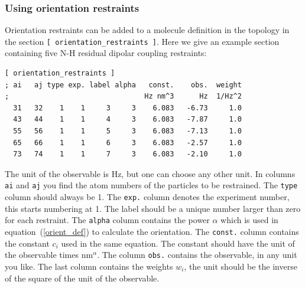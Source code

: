 \subsubsection{Using orientation restraints}
Orientation restraints can be added to a molecule definition in
the topology in the section {\tt [ orientation\_restraints ]}.
Here we give an example section containing five N-H residual dipolar
coupling restraints:
\begin{verbatim}
[ orientation_restraints ]
; ai   aj type exp. label alpha   const.    obs.  weight 
;                                Hz nm^3      Hz  1/Hz^2
  31   32    1    1     3     3    6.083   -6.73     1.0
  43   44    1    1     4     3    6.083   -7.87     1.0
  55   56    1    1     5     3    6.083   -7.13     1.0
  65   66    1    1     6     3    6.083   -2.57     1.0
  73   74    1    1     7     3    6.083   -2.10     1.0
\end{verbatim}
The unit of the observable is Hz, but one can choose any other unit.
In columns {\tt
ai} and {\tt aj} you find the atom numbers of the particles to be
restrained. The {\tt type} column should always be 1.
The {\tt exp.} column denotes the experiment number, this starts
numbering at 1. The label should be a unique number larger than zero
for each restraint. The {\tt alpha} column contains the power $\alpha$ 
which is used in equation~(\ref{orient_def}) to calculate the orientation.
The {\tt const.} column contains the constant $c_i$ used in the same
equation. The constant should have the unit of the observable times
nm$^\alpha$. The column {\tt obs.} contains the observable, in any
unit you like. The last column contains the weights $w_i$, the unit
should be the inverse of the square of the unit of the observable.

